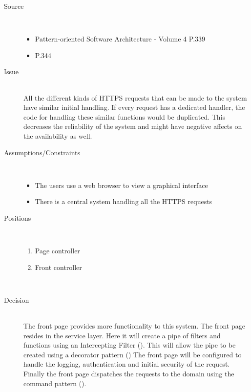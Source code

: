 


\begin{description}
\item [Source]~
\begin{itemize}
\item Pattern-oriented Software Architecture - Volume 4 \cite{wiley-4} P.339
\item \EAA  \cite{Fowler:2002:PEA:579257} P.344
\end{itemize}

\item [Issue]~\\
All the different kinds of HTTPS requests that can be made to the system have similar initial handling. If every request has a dedicated handler, the code for handling these similar functions would be duplicated. This decreases the reliability  of the system and might have negative affects on the availability as well.

\item [Assumptions/Constraints]~
\begin{itemize}
\item The users use a web browser to view a graphical interface
\item There is a central system handling all the HTTPS requests
\end{itemize}

\item [Positions]~
\begin{enumerate}
\item Page controller
\item Front controller 
\end{enumerate}

~\\[-1.5cm]
\item [Decision] ~\\
The front page provides more functionality to this system. The front page resides in the service layer. Here it will create a pipe of filters and functions using an Intercepting Filter (\cite{eaa}). This will allow the pipe to be created using a decorator pattern (\cite{eaa}) The front page will be configured to handle the logging, authentication and initial security of the request. Finally the front page dispatches the requests to the domain using the command pattern (\cite{eaa}). 


\end{description}
